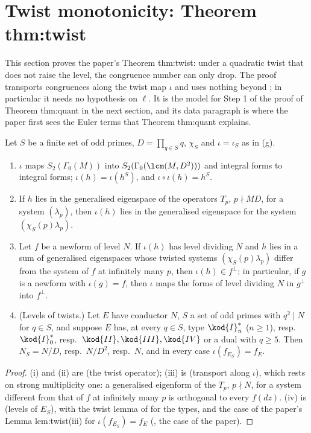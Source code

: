 \section{Twist monotonicity: Theorem thm:twist}\label{sec:congruence:twist}

This section proves the paper's Theorem thm:twist: under a quadratic twist that does not raise the level, the congruence number can only drop. The proof transports
congruences along the twist map $\iota$ and uses nothing beyond ; in particular it needs no hypothesis on $\ell$. It is the model for Step 1 of the proof of
Theorem thm:quant in the next section, and its data paragraph is where the paper first sees the Euler terms that Theorem thm:quant explains.

\begin{proposition}\label{prop:congruence:twist-inputs}
Let $S$ be a finite set of odd primes, $D=\prod_{q\in S}q$, $\chi_S$ and $\iota=\iota_S$ as in (g).
\begin{enumerate}[label=(\roman*)]
\item $\iota$ maps $S_2(\Gamma_0(M))$ into $S_2(\Gamma_0(\lcm(M,D^2)))$ and integral forms to integral forms; $\iota(h)=\iota(h^S)$, and $\iota\circ\iota(h)=h^S$.
\item If $h$ lies in the generalised eigenspace of the operators $T_p$, $p\nmid MD$, for a system $(\lambda_p)$, then $\iota(h)$ lies in the generalised eigenspace for the system $(\chi_S(p)\lambda_p)$.
\item Let $f$ be a newform of level $N$. If $\iota(h)$ has level dividing $N$ and $h$ lies in a sum of generalised eigenspaces whose twisted systems $(\chi_S(p)\lambda_p)$ differ from the system of $f$
at infinitely many $p$, then $\iota(h)\in f^\perp$; in particular, if $g$ is a newform with $\iota(g)=f$, then $\iota$ maps the forms of level dividing $N$ in
$g^\perp$ into $f^\perp$.
\item (Levels of twists.) Let $E$ have conductor $N$, $S$ a set of odd primes with $q^2\mid N$ for $q\in S$, and suppose $E$ has, at every $q\in S$, type $\kod{I}_n^*$ ($n\ge1$), resp.\ $\kod{I}_0^*$, resp.\
$\kod{II},\kod{III},\kod{IV}$ or a dual with $q\ge5$. Then $N_S=N/D$, resp.\ $N/D^2$, resp.\ $N$, and in every case $\iota(f_{E_S})=f_E$.
\end{enumerate}
\end{proposition}

\begin{proof}
(i) and (ii) are  (the twist operator); (iii) is  (transport along $\iota$), which rests on strong multiplicity one: a generalised eigenform of the $T_p$, $p\nmid N$,
for a system different from that of $f$ at infinitely many $p$ is orthogonal to every $f(dz)$. (iv) is \Cref{ch:modgalrep} (levels of $E_S$), with the twist lemma of \Cref{ch:reduction} for the
types, and the case of the paper's Lemma lem:twist(iii) for $\iota(f_{E_S})=f_E$ (\Cref{ch:hecke}, the case of the paper).
\end{proof}

